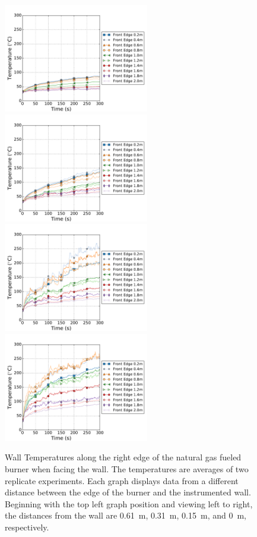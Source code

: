 \documentclass[twoside]{uocthesis}
\begin{document}
{\begin{figure}[ht!]
	\centering
	\includegraphics[width=2.5in]{../Figures/TWNG01_TC_Surface_Offset_Avg}
	\includegraphics[width=2.5in]{../Figures/TWNG03_TC_Surface_Offset_Avg}\\
	\includegraphics[width=2.5in]{../Figures/TWNG05_TC_Surface_Offset_Avg}
	\includegraphics[width=2.5in]{../Figures/TWNG07_TC_Surface_Offset_Avg}\\
	\caption[Wall temperatures along the edge of the natural gas fueled burner]{Wall Temperatures along the right edge of the natural gas fueled burner when facing the wall. The temperatures are averages of two replicate experiments. Each graph displays data from a different distance between the edge of the burner and the instrumented wall.  Beginning with the top left graph position and viewing left to right, the distances from the wall are 0.61~m, 0.31~m, 0.15~m, and 0~m, respectively.}
	\label{TC_Surf_Edge_TWNG_comp}
\end{figure}

}
\end{document}
